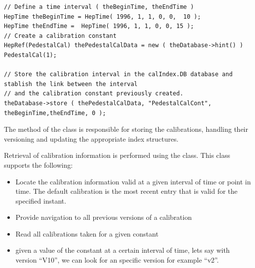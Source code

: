 \begin{verbatim}
// Define a time interval ( theBeginTime, theEndTime ) 
HepTime theBeginTime = HepTime( 1996, 1, 1, 0, 0,  10 ); 
HepTime theEndTime =  HepTime( 1996, 1, 1, 0, 0, 15 ); 
// Create a calibration constant 
HepRef(PedestalCal) thePedestalCalData = new ( theDatabase->hint() ) PedestalCal(1); 

// Store the calibration interval in the calIndex.DB database and stablish the link between the interval 
// and the calibration constant previously created. 
theDatabase->store ( thePedestalCalData, "PedestalCalCont", theBeginTime,theEndTime, 0 ); 
\end{verbatim}

\par

The  method of the  class is responsible
for storing the calibrations, handling their versioning and updating the appropriate index
structures.
\par

Retrieval of calibration information is performed using the  class.
This class supports the following:
\begin{itemize}

\item Locate the calibration information valid at a given interval of
time or point in time.  The default calibration is the most recent
entry that is valid for the specified instant.
\item Provide navigation to all previous versions of a calibration
\item Read all calibrations taken for a given constant
\item given a value of the constant at a certain interval of time,
lets say with version ``V10'', we can look for an specific version for
example ``v2''. \end{itemize}

\par

